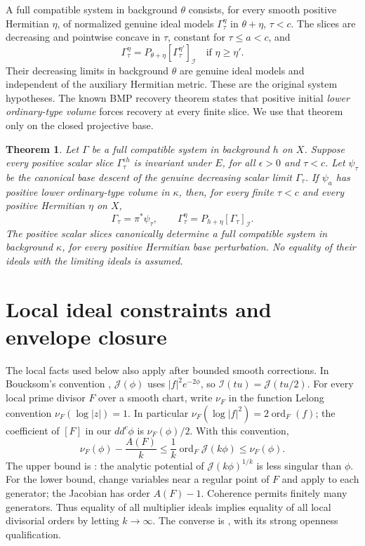 \documentclass[11pt]{article}
\newcommand{\ddc}{dd^c}
\newcommand{\PI}[2]{P_{#1}[#2]_{\mathcal I}}
\newtheorem{theorem}{Theorem}
\begin{document}
A full compatible system in background $\theta$ consists, for every
smooth positive Hermitian $\eta$, of normalized genuine ideal models
$\Gamma_\tau^\eta$ in $\theta+\eta$, $\tau<c$. The slices are decreasing
and pointwise concave in $\tau$, constant for $\tau\leq a<c$, and
\[
 \Gamma_\tau^\eta=\PI{\theta+\eta}{\Gamma_\tau^{\eta'}}
                 \quad\text{if }\eta\geq\eta'.
\]
Their decreasing limits in background $\theta$ are genuine ideal models
and independent of the auxiliary Hermitian metric. These are the original
system hypotheses. The known BMP recovery theorem states that positive
initial \emph{lower ordinary-type volume} forces recovery at every finite
slice. We use that theorem only on the closed projective base.

\begin{theorem}\label{thm:criterion}
Let $\Gamma$ be a full compatible system in background $h$ on $X$.
Suppose every positive scalar slice $\Gamma_\tau^{\epsilon h}$ is
invariant under $E$, for all $\epsilon>0$ and $\tau<c$.
Let $\psi_\tau$ be the canonical base descent of the genuine decreasing
scalar limit $\Gamma_\tau$. If $\psi_a$ has positive lower
ordinary-type volume in $\kappa$, then, for every finite $\tau<c$
and every positive Hermitian $\eta$ on $X$,
\[
 \Gamma_\tau=\pi^*\psi_\tau,\qquad
 \Gamma_\tau^\eta=\PI{h+\eta}{\Gamma_\tau}.
\]
The positive scalar slices canonically determine a full compatible system
in background $\kappa$, for every positive Hermitian base perturbation.
No equality of their ideals with the limiting ideals is assumed.
\end{theorem}

\section{Local ideal constraints and envelope closure}
The local facts used below also apply after bounded smooth corrections.
In Boucksom's convention \cite{Bou}, $\mathcal J(\phi)$ uses
$|f|^2e^{-2\phi}$, so $\mathcal I(tu)=\mathcal J(tu/2)$.
For every local prime divisor $F$ over a smooth chart,
write $\nu_F$ in the function Lelong convention
$\nu_F(\log|z|)=1$. In particular
$\nu_F(\log|f|^2)=2\operatorname{ord}_F(f)$; the coefficient of
$[F]$ in our $\ddc\phi$ is $\nu_F(\phi)/2$. With this convention,
\begin{equation}\label{eq:orders}
 \nu_F(\phi)-\frac{A(F)}k
 \leq\frac1k\operatorname{ord}_F\mathcal J(k\phi)
 \leq\nu_F(\phi).
\end{equation}
The upper bound is \cite[Theorem 9.17]{Bou}: the analytic potential of
$\mathcal J(k\phi)^{1/k}$ is less singular than $\phi$. For the lower
bound, change variables near a regular point of $F$ and apply
\cite[Lemma 10.17 and Theorem 10.13]{Bou} to each generator; the Jacobian
has order $A(F)-1$. Coherence permits finitely many generators.
Thus equality of all multiplier ideals implies equality of all local
divisorial orders by letting $k\to\infty$. The converse is
\cite[Corollary 10.18]{Bou}, with its strong openness qualification.
\end{document}
